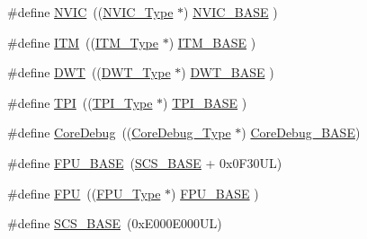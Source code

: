 \begin{DoxyCompactItemize}
\item 
\#define \mbox{\hyperlink{group___c_m_s_i_s__core__base_gac8e97e8ce56ae9f57da1363a937f8a17}{N\+V\+IC}}~((\mbox{\hyperlink{struct_n_v_i_c___type}{N\+V\+I\+C\+\_\+\+Type}}      $\ast$)     \mbox{\hyperlink{group___c_m_s_i_s__core__base_gaa0288691785a5f868238e0468b39523d}{N\+V\+I\+C\+\_\+\+B\+A\+SE}}     )
\item 
\#define \mbox{\hyperlink{group___c_m_s_i_s__core__base_gabae7cdf882def602cb787bb039ff6a43}{I\+TM}}~((\mbox{\hyperlink{struct_i_t_m___type}{I\+T\+M\+\_\+\+Type}}       $\ast$)     \mbox{\hyperlink{group___c_m_s_i_s__core__base_gadd76251e412a195ec0a8f47227a8359e}{I\+T\+M\+\_\+\+B\+A\+SE}}      )
\item 
\#define \mbox{\hyperlink{group___c_m_s_i_s__core__base_gabbe5a060185e1d5afa3f85b14e10a6ce}{D\+WT}}~((\mbox{\hyperlink{struct_d_w_t___type}{D\+W\+T\+\_\+\+Type}}       $\ast$)     \mbox{\hyperlink{group___c_m_s_i_s__core__base_gafdab534f961bf8935eb456cb7700dcd2}{D\+W\+T\+\_\+\+B\+A\+SE}}      )
\item 
\#define \mbox{\hyperlink{group___c_m_s_i_s__core__base_ga8b4dd00016aed25a0ea54e9a9acd1239}{T\+PI}}~((\mbox{\hyperlink{struct_t_p_i___type}{T\+P\+I\+\_\+\+Type}}       $\ast$)     \mbox{\hyperlink{group___c_m_s_i_s__core__base_ga2b1eeff850a7e418844ca847145a1a68}{T\+P\+I\+\_\+\+B\+A\+SE}}      )
\item 
\#define \mbox{\hyperlink{group___c_m_s_i_s__core__base_gab6e30a2b802d9021619dbb0be7f5d63d}{Core\+Debug}}~((\mbox{\hyperlink{struct_core_debug___type}{Core\+Debug\+\_\+\+Type}} $\ast$)     \mbox{\hyperlink{group___c_m_s_i_s__core__base_ga680604dbcda9e9b31a1639fcffe5230b}{Core\+Debug\+\_\+\+B\+A\+SE}})
\item 
\#define \mbox{\hyperlink{group___c_m_s_i_s__core__base_ga4dcad4027118c098c07bcd575f1fbb28}{F\+P\+U\+\_\+\+B\+A\+SE}}~(\mbox{\hyperlink{group___c_m_s_i_s__core__base_ga3c14ed93192c8d9143322bbf77ebf770}{S\+C\+S\+\_\+\+B\+A\+SE}} +  0x0\+F30\+U\+L)
\item 
\#define \mbox{\hyperlink{group___c_m_s_i_s__core__base_gabc7c93f2594e85ece1e1a24f10591428}{F\+PU}}~((\mbox{\hyperlink{struct_f_p_u___type}{F\+P\+U\+\_\+\+Type}}       $\ast$)     \mbox{\hyperlink{group___c_m_s_i_s__core__base_ga4dcad4027118c098c07bcd575f1fbb28}{F\+P\+U\+\_\+\+B\+A\+SE}}      )
\item 
\#define \mbox{\hyperlink{group___c_m_s_i_s__core__base_ga3c14ed93192c8d9143322bbf77ebf770}{S\+C\+S\+\_\+\+B\+A\+SE}}~(0x\+E000\+E000\+U\+L)
\item 

\end{DoxyCompactItemize}

